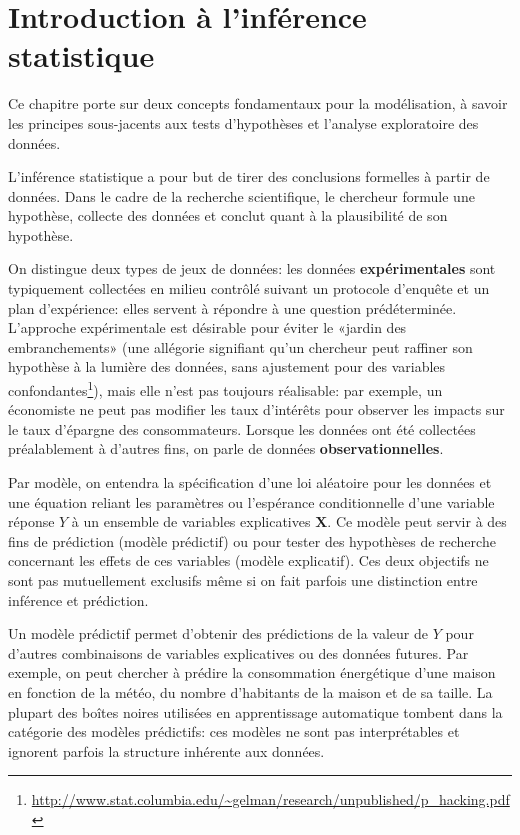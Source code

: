 \documentclass[
  11pt,
  letterpaper,
]{article}
\renewcommand{\href}[2]{#2\footnote{\url{#1}}}
\theoremstyle{definition}
\theoremstyle{definition}
\theoremstyle{definition}
\theoremstyle{definition}
\theoremstyle{remark}
\begin{document}
\hypertarget{intro}{%
\section{Introduction à l'inférence statistique}\label{intro}}

Ce chapitre porte sur deux concepts fondamentaux pour la modélisation, à savoir les principes sous-jacents aux tests d'hypothèses et l'analyse exploratoire des données.

L'inférence statistique a pour but de tirer des conclusions formelles à partir de données. Dans le cadre de la recherche scientifique, le chercheur formule une hypothèse, collecte des données et conclut quant à la plausibilité de son hypothèse.

On distingue deux types de jeux de données: les données \textbf{expérimentales} sont typiquement collectées en milieu contrôlé suivant un protocole d'enquête et un plan d'expérience: elles servent à répondre à une question prédéterminée. L'approche expérimentale est désirable pour éviter le «jardin des embranchements» (une \href{http://www.stat.columbia.edu/~gelman/research/unpublished/p_hacking.pdf}{allégorie signifiant qu'un chercheur peut raffiner son hypothèse à la lumière des données, sans ajustement pour des variables confondantes}), mais elle n'est pas toujours réalisable: par exemple, un économiste ne peut pas modifier les taux d'intérêts pour observer les impacts sur le taux d'épargne des consommateurs. Lorsque les données ont été collectées préalablement à d'autres fins, on parle de données \textbf{observationnelles}.

Par modèle, on entendra la spécification d'une loi aléatoire pour les données et une équation reliant les paramètres ou l'espérance conditionnelle d'une variable réponse \(Y\) à un ensemble de variables explicatives \(\mathbf{X}\). Ce modèle peut servir à des fins de prédiction (modèle prédictif) ou pour tester des hypothèses de recherche concernant les effets de
ces variables (modèle explicatif). Ces deux objectifs ne sont pas mutuellement exclusifs même si on fait parfois une distinction entre inférence et prédiction.

Un modèle prédictif permet d'obtenir des prédictions de la valeur de \(Y\) pour d'autres combinaisons de variables explicatives ou des données futures. Par exemple, on peut chercher à prédire la consommation énergétique d'une maison en fonction de la météo, du nombre d'habitants de la maison et de sa taille. La plupart des boîtes noires utilisées en apprentissage automatique tombent dans la catégorie des modèles prédictifs: ces modèles ne sont pas interprétables et ignorent parfois la structure inhérente aux données.
\end{document}
